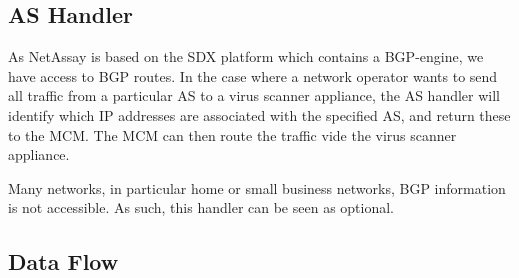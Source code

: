 \documentclass{sig-alternate}
\newcommand\system{NetAssay}
\begin{document}

\subsection{AS Handler}
As \system{} is based on the SDX platform which contains a BGP-engine, we have access to BGP routes. In the case where a network operator wants to send all traffic from a particular AS to a virus scanner appliance, the AS handler will identify which IP addresses are associated with the specified AS, and return these to the MCM. The MCM can then route the traffic vide the virus scanner appliance.


Many networks, in particular home or small business networks, BGP information is not accessible. As such, this handler can be seen as optional.



\subsection{Data Flow}


\end{document}
